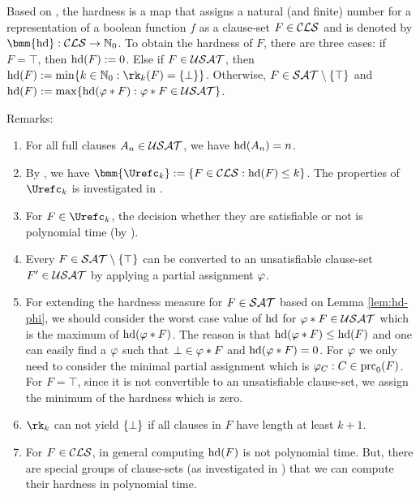 \documentclass{report}
\begin{document}
\begin{defi}\label{def:hd-extended}
Based on \cite{BeyersdorffGwynneKullmann2013PHPER}, the hardness is a map that assigns a natural (and finite) number for a representation of a boolean function $f$ as a clause-set $F \in \mathcal{CLS}$ and is denoted by $\bmm{\hardness} : \Cls \rightarrow \NNZ$. To obtain the hardness of  $F$, there are three cases: if $F = \top$, then $\operatorname{hd}(F) := 0$. Else if $F \in \mathcal{USAT}$, then $\hardness(F) := \min \set{k \in \NNZ : \rk_k(F)=\set{\bot}}$. Otherwise, $F \in \mathcal{SAT} \setminus \{ \top \}$ and $\operatorname{hd}(F) := \max \{  \operatorname{hd}(\varphi * F) : \varphi * F \in \mathcal{USAT}  \}$.
\end{defi}

Remarks:
  \begin{enumerate}
  \item For all full clauses $A_n \in \mathcal{USAT}$, we have $\operatorname{hd}(A_n)=n$.
  \item By \cite{BeyersdorffGwynneKullmann2013PHPER}, we have $\bmm{\Urefc_k} := \set{F \in \Cls : \hardness(F) \le k}$. The properties of $\Urefc_k$ is investigated in \cite{GwynneKullmann2012Slur}.
  \item For $F \in \Urefc_k$, the decision whether they are satisfiable or not is polynomial time (by \cite{GwynneKullmann2012Slur}).
  \item Every $F \in \mathcal{SAT} \setminus \{ \top \}$ can be converted to an unsatisfiable clause-set $F' \in \mathcal{USAT}$ by applying a partial assignment $\varphi$. 
  \item For extending the hardness measure for $F \in \mathcal{SAT}$ based on Lemma \ref{lem:hd-phi}, we should consider the worst case value of $\operatorname{hd}$ for $\varphi * F \in \mathcal{USAT}$ which is the maximum of $\operatorname{hd}(\varphi * F)$. The reason is that $\operatorname{hd}(\varphi * F) \leq \operatorname{hd}(F)$ and one can easily find a $\varphi$ such that $\bot \in \varphi * F$ and $\operatorname{hd}(\varphi * F)=0$. For $\varphi$ we only need to consider the minimal partial assignment which is $\varphi_C : C \in \operatorname{prc}_0(F)$. For $F = \top$, since it is not convertible to an unsatisfiable clause-set, we assign the minimum of the hardness which is zero.  
  \item $\rk_k$ can not yield $\{ \bot \}$ if all clauses in $F$ have length at least $k+1$.
  \item For $F \in \mathcal{CLS}$, in general computing $\operatorname{hd}(F)$ is not polynomial time. But, there are special groups of clause-sets (as investigated in \cite{GwynneKullmann2012Slur}) that we can compute their hardness in polynomial time. 
\end{enumerate}
\end{document}
